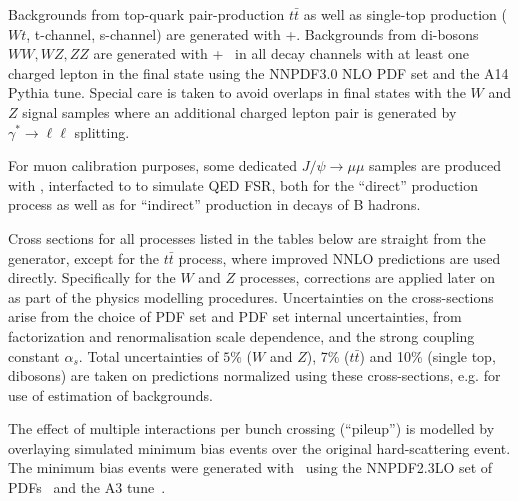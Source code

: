 Backgrounds from top-quark pair-production $t\bar{t}$ as well as
single-top production ($Wt$, t-channel, s-channel) are generated with
\Powheg+\Pythia. Backgrounds from di-bosons
$WW, WZ, ZZ$ are generated with \Powheg+\Pythia~\cite{Nason:2013ydw}
in all decay channels with at least one charged lepton in the final
state using the NNPDF3.0 NLO PDF set and the A14 Pythia tune. Special
care is taken to avoid overlaps in final states with the $W$ and $Z$
signal samples where an additional charged lepton pair is generated by
$\gamma^* \to \ell\ell$ splitting.

For muon calibration purposes, some dedicated $J/\psi \to \mu\mu$
samples are produced with \Pythia, interfacted to \Photos{} to
simulate QED FSR, both for the ``direct'' production process as well
as for ``indirect'' production in decays of B hadrons.

Cross sections for all processes listed in the tables below are
straight from the generator, except for the $t\bar{t}$ process, where
improved NNLO predictions are used directly. Specifically for the $W$
and $Z$ processes, corrections are applied later on as part of the
physics modelling procedures. Uncertainties on the cross-sections
arise from the choice of PDF set and PDF set internal uncertainties,
from factorization and renormalisation scale dependence, and the
strong coupling constant $\alpha_s$. Total uncertainties of $5\%$ ($W$
and $Z$), 7\% ($t\bar{t}$) and 10\% (single top, dibosons) are taken
on predictions normalized using these cross-sections,
e.g. for use of estimation of backgrounds.

The effect of multiple interactions per bunch crossing (``pileup'') is
modelled by overlaying simulated minimum bias events over the original
hard-scattering event. The minimum bias events were generated with
\Pythia\ using the NNPDF2.3LO set of PDFs~\cite{Ball:2012cx} and the A3
tune~\cite{ATL-PHYS-PUB-2016-017}.


